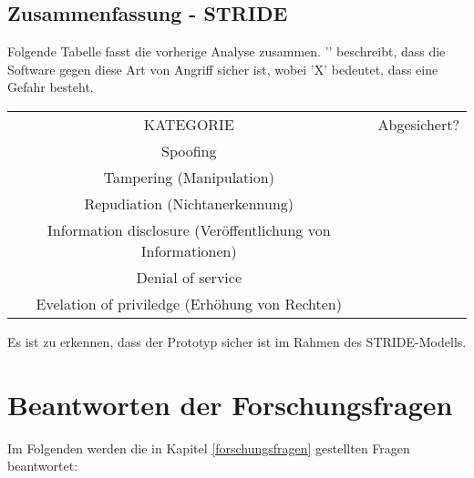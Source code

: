 \subsection{Zusammenfassung - STRIDE}
Folgende Tabelle fasst die vorherige Analyse zusammen. '\checkmark' beschreibt, dass die Software gegen diese Art von Angriff sicher ist, wobei 'X' bedeutet, dass eine Gefahr besteht. 
\begin{center}
	\begin{tabular}{ c c }
		KATEGORIE & Abgesichert? \\
		Spoofing & \checkmark \\
		Tampering (Manipulation) & \checkmark \\
		Repudiation (Nichtanerkennung) & \checkmark\\
		Information disclosure (Veröffentlichung von Informationen) &\checkmark\\
		Denial of service & \checkmark\\
		Evelation of priviledge (Erhöhung von Rechten) & \checkmark \\
	\end{tabular}
\end{center}
Es ist zu erkennen, dass der Prototyp sicher ist im Rahmen des STRIDE-Modells.

\section{Beantworten der Forschungsfragen}
Im Folgenden werden die in Kapitel \ref{forschungsfragen} gestellten Fragen beantwortet:



